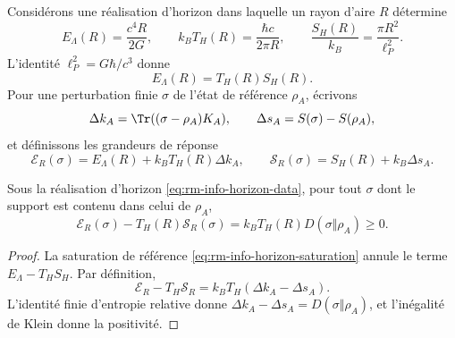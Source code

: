 Considérons une réalisation d'horizon dans laquelle un rayon d'aire \(R\)
détermine
\begin{equation}
 E_\Lambda(R)=\frac{c^4R}{2G},
 \qquad
 k_BT_H(R)=\frac{\hbar c}{2\pi R},
 \qquad
 \frac{S_H(R)}{k_B}=\frac{\pi R^2}{\ell_P^2}.
 \label{eq:rm-info-horizon-data}
\end{equation}
L'identité \(\ell_P^2=G\hbar/c^3\) donne
\begin{equation}
 \boxed{E_\Lambda(R)=T_H(R)S_H(R).}
 \label{eq:rm-info-horizon-saturation}
\end{equation}
Pour une perturbation finie \(\sigma\) de l'état de référence
\(\rho_A\), écrivons
\begin{equation}
 \Delta k_A=\Tr((\sigma-\rho_A)K_A),
 \qquad
 \Delta s_A=S(\sigma)-S(\rho_A),
 \label{eq:rm-info-delta-k-s}
\end{equation}
et définissons les grandeurs de réponse
\begin{equation}
 \mathcal E_R(\sigma)
 =E_\Lambda(R)+k_BT_H(R)\Delta k_A,
 \qquad
 \mathcal S_R(\sigma)
 =S_H(R)+k_B\Delta s_A.
 \label{eq:rm-info-response-energy-entropy}
\end{equation}

\begin{theorem}
\label{thm:rm-info-free-energy}
Sous la réalisation d'horizon
\cref{eq:rm-info-horizon-data}, pour tout \(\sigma\) dont le support est contenu
dans celui de \(\rho_A\),
\begin{equation}
 \boxed{
 \mathcal E_R(\sigma)-T_H(R)\mathcal S_R(\sigma)
 =k_BT_H(R)D(\sigma\Vert\rho_A)
 \geq0.}
 \label{eq:rm-info-free-energy}
\end{equation}
\end{theorem}

\begin{proof}
La saturation de référence
\cref{eq:rm-info-horizon-saturation} annule le terme
\(E_\Lambda-T_HS_H\). Par définition,
\[
 \mathcal E_R-T_H\mathcal S_R
 =k_BT_H(\Delta k_A-\Delta s_A).
\]
L'identité finie d'entropie relative donne
\(\Delta k_A-\Delta s_A=D(\sigma\Vert\rho_A)\), et l'inégalité de Klein
donne la positivité.
\end{proof}

